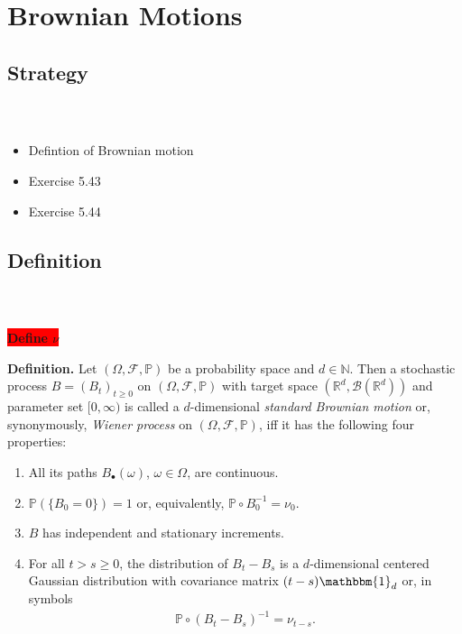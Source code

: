 \documentclass{beamer}
\numberwithin{equation}{section}
\newcommand{\task}[1]{
    \begin{center}
        \colorbox{red}{
            \textsf{
                \textbf{#1}
            }
        }
    \end{center}
}
\newenvironment{frame2}{\begin{frame}\frametitle{{\normalsize \secname} \\ {\large \subsecname}}}{\end{frame}}
\begin{document}
\section{Brownian Motions}

\subsection{Strategy}
\begin{frame2}
    \begin{itemize}
        \item Defintion of Brownian motion
        \item Exercise 5.43
        \item Exercise 5.44
    \end{itemize}
\end{frame2}

\subsection{Definition}

\begin{frame2}
    \task{Define $\nu$} 
    \textbf{Definition.} Let $(\Omega,\mathcal{F},\mathbb{P})$ be a probability space and $d\in\mathbb{N}$.
    Then a stochastic process $B = (B_t)_{t\geq 0}$ on $(\Omega,\mathcal{F},\mathbb{P})$ with target space $(\mathbb{R}^d,\mathcal{B}(\mathbb{R}^d))$ and parameter set $[0,\infty)$ is called a $d$-dimensional \textit{standard Brownian motion} or, synonymously, \textit{Wiener process} on $(\Omega,\mathcal{F},\mathbb{P})$, iff it has the following four properties:
    \begin{enumerate}
        \item All its paths $B_\bullet(\omega)$, $\omega \in \Omega$, are continuous.
        \item $\mathbb{P}(\{B_0 = 0\})=1$ or, equivalently, $\mathbb{P} \circ B^{-1}_0 = \nu_0$.
        \item $B$ has independent and stationary increments.
        \item For all $t > s \geq 0$, the distribution of $B_t - B_s$ is a $d$-dimensional centered Gaussian distribution with covariance matrix $(t-s)\mathbbm{1}_d$ or, in symbols
        \begin{align}
            \mathbb{P} \circ (B_t - B_s)^{-1} = \nu_{t - s}.
        \end{align} 
    \end{enumerate}
\end{frame2}
\end{document}

